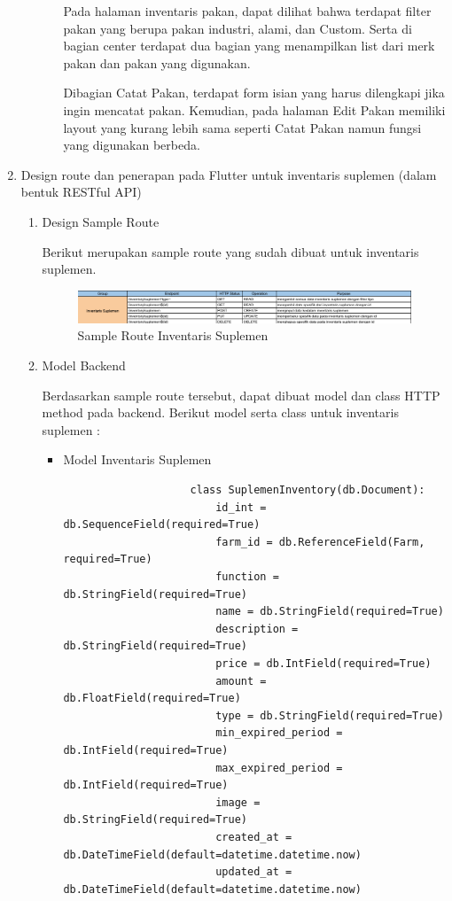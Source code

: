 \begin{spacing}{1.5}
\begin{enumerate}
\begin{enumerate}
\begin{itemize}
				Pada halaman inventaris pakan, dapat dilihat bahwa terdapat filter pakan yang berupa pakan industri, alami, dan Custom. Serta di bagian center terdapat dua bagian yang menampilkan list dari merk pakan dan pakan yang digunakan.

				Dibagian Catat Pakan, terdapat form isian yang harus dilengkapi jika ingin mencatat pakan. Kemudian, pada halaman Edit Pakan memiliki layout yang kurang lebih sama seperti Catat Pakan namun fungsi yang digunakan berbeda.

			\end{itemize}
		\end{enumerate}

		\item Design route dan penerapan pada Flutter untuk inventaris suplemen (dalam bentuk RESTful API)
		
		\begin{enumerate}
			\item Design Sample Route
			
			Berikut merupakan sample route yang sudah dibuat untuk inventaris suplemen.

			\begin{figure}[H]
				\centering
				\includegraphics[width=1\textwidth]{gambar/sprint4/suplemen_sample_route.png}
				\caption{Sample Route Inventaris Suplemen}
			\end{figure}

			\item Model Backend
 			
			Berdasarkan sample route tersebut, dapat dibuat model dan class HTTP method pada backend. Berikut model serta class untuk inventaris suplemen :

			\begin{itemize}
				\item Model Inventaris Suplemen
				
				\begin{lstlisting}
					class SuplemenInventory(db.Document):
						id_int = db.SequenceField(required=True)
						farm_id = db.ReferenceField(Farm, required=True)
						function = db.StringField(required=True)
						name = db.StringField(required=True)
						description = db.StringField(required=True)
						price = db.IntField(required=True)
						amount = db.FloatField(required=True)
						type = db.StringField(required=True)
						min_expired_period = db.IntField(required=True)
						max_expired_period = db.IntField(required=True)
						image = db.StringField(required=True)
						created_at = db.DateTimeField(default=datetime.datetime.now)
						updated_at = db.DateTimeField(default=datetime.datetime.now)
				\end{lstlisting}
			\end{itemize}


\end{enumerate}
\end{enumerate}
\end{spacing}
